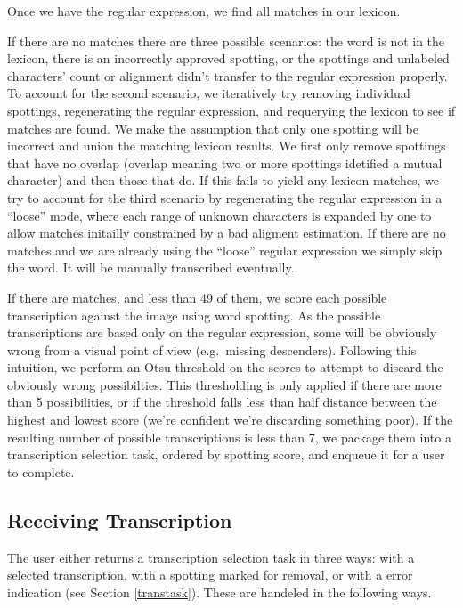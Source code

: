 \documentclass[ms,electronic,twosidetoc,letterpaper,chaptercenter,parttop,lof,lot]{byumsphd}
\begin{document}
Once we have the regular expression, we find all matches in our lexicon.

If there are no matches there are three possible scenarios: the word is not in the lexicon, there is an incorrectly approved spotting, or the spottings and unlabeled characters' count or alignment didn't transfer to the regular expression properly.
To account for the second scenario, we iteratively try removing individual spottings, regenerating the regular expression, and requerying the lexicon to see if matches are found. We make the assumption that only one spotting will be incorrect and union the matching lexicon results. We first only remove spottings that have no overlap (overlap meaning two or more spottings idetified a mutual character) and then those that do.
If this fails to yield any lexicon matches, we try to account for the third scenario by regenerating the regular expression in a ``loose'' mode, where each range of unknown characters is expanded by one to allow matches initailly constrained by a bad aligment estimation.
If there are no matches and we are already using the ``loose'' regular expression we simply skip the word. It will be manually transcribed eventually.

If there are matches, and less than 49 of them, we score each possible transcription against the image using word spotting.
As the possible transcriptions are based only on the regular expression, some will be obviously wrong from a visual point of view (e.g.~missing descenders). Following this intuition, we perform an Otsu threshold on the scores to attempt to discard the obviously wrong possibilties. This thresholding is only applied if there are more than 5 possibilities, or if the threshold falls less than half distance between the highest and lowest score (we're confident we're discarding something poor).
If the resulting number of possible transcriptions is less than 7, we package them into a transcription selection task, ordered by spotting score, and enqueue it for a user to complete.


\subsection{Receiving Transcription}
The user either returns a transcription selection task in three ways: with a selected transcription, with a spotting marked for removal, or with a error indication (see Section \ref{transtask}). These are handeled in the following ways.
\end{document}
